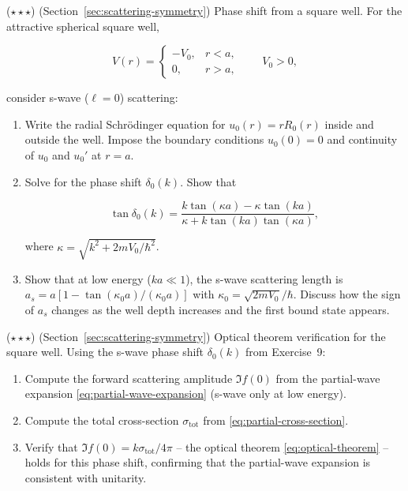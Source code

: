 \begin{problemset}
\item ($\star\star\star$) (Section~\ref{sec:scattering-symmetry}) Phase shift from a square well. For the attractive spherical square well,
\begin{linenomath}
\begin{equation*}
V(r) = \begin{cases}
-V_{0}, & r < a, \\
0, & r > a,
\end{cases}
\qquad V_{0} > 0,
\end{equation*}
\end{linenomath}
consider s-wave ($\ell=0$) scattering:
\begin{enumerate}
\item[(a)] Write the radial Schr\"odinger equation for $u_{0}(r)=rR_{0}(r)$ inside and outside the well. Impose the boundary conditions $u_{0}(0)=0$ and continuity of $u_{0}$ and $u_{0}'$ at $r=a$.
\item[(b)] Solve for the phase shift $\delta_{0}(k)$. Show that
\begin{linenomath}
\begin{equation*}
\tan\delta_{0}(k) = \frac{k\tan(\kappa a) - \kappa\tan(ka)}{\kappa + k\tan(ka)\tan(\kappa a)},
\end{equation*}
\end{linenomath}
where $\kappa = \sqrt{k^{2} + 2mV_{0}/\hbar^{2}}$.
\item[(c)] Show that at low energy ($ka \ll 1$), the s-wave scattering length is $a_{s} = a[1 - \tan(\kappa_{0}a)/(\kappa_{0}a)]$ with $\kappa_{0} = \sqrt{2mV_{0}}/\hbar$. Discuss how the sign of $a_{s}$ changes as the well depth increases and the first bound state appears.
\end{enumerate}

\item ($\star\star\star$) (Section~\ref{sec:scattering-symmetry}) Optical theorem verification for the square well. Using the s-wave phase shift $\delta_{0}(k)$ from Exercise~9:
\begin{enumerate}
\item[(a)] Compute the forward scattering amplitude $\Im f(0)$ from the partial-wave expansion \eqref{eq:partial-wave-expansion} (s-wave only at low energy).
\item[(b)] Compute the total cross-section $\sigma_{\text{tot}}$ from \eqref{eq:partial-cross-section}.
\item[(c)] Verify that $\Im f(0) = k\sigma_{\text{tot}}/4\pi$ -- the optical theorem \eqref{eq:optical-theorem} -- holds for this phase shift, confirming that the partial-wave expansion is consistent with unitarity.
\end{enumerate}

\end{problemset}
